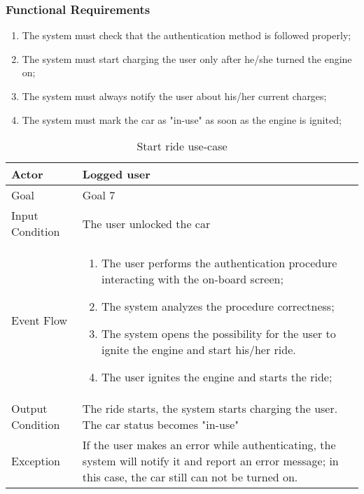 \subsubsection{Functional Requirements}
\begin{enumerate}
\item The system must check that the authentication method is followed properly;
\item The system must start charging the user only after he/she turned the engine on;
\item The system must always notify the user about his/her current charges;
\item The system must mark the car as "in-use" as soon as the engine is ignited;
\end{enumerate}

\begin{table}[H]
\begin{center}
\begin{tabular}{p{} | p{}}
\hline
Actor & Logged user\\
\hline
Goal & Goal 7\\
\hline
Input Condition & The user unlocked the car\\
\hline
Event Flow & 
\begin{enumerate}
\item The user performs the authentication procedure interacting with the on-board screen;
\item The system analyzes the procedure correctness;
\item The system opens the possibility for the user to ignite the engine and start his/her ride.
\item The user ignites the engine and starts the ride;
\end{enumerate} \\
\hline
Output Condition & The ride starts, the system starts charging the user. The car status becomes "in-use"\\
\hline
Exception & If the user makes an error while authenticating, the system will notify it and report an error message; in this case, the car still can not be turned on.\\
\hline
\end{tabular}
\end{center}
\caption{Start ride use-case}
\label{start_ride_uc}
\end{table}